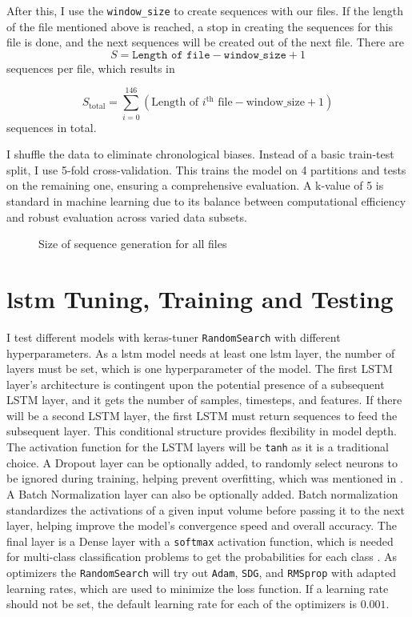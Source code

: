 After this, I use the \texttt{window\_size} to create sequences with our files.
If the length of the file mentioned above is reached, a stop in creating the sequences for this file is done, and the next sequences will be created out of the next file.
There are 
\[S = \texttt{Length of file} - \texttt{window\_size} + 1\] 
sequences per file, which results in 

\[
    S_{\text{total}} = \sum_{i=0}^{146} (\text{Length of } i^{\text{th}} \text{ file} - \text{window\_size} + 1)
\]
sequences in total.

I shuffle the data to eliminate chronological biases. 
Instead of a basic train-test split, I use 5-fold cross-validation.
This trains the model on 4 partitions and tests on the remaining one, ensuring a comprehensive evaluation.
A k-value of 5 is standard in machine learning due to its balance between computational efficiency and robust evaluation across varied data subsets.

\begin{figure}[h]
    \centering
    
    \caption{Size of sequence generation for all files}
    \label{fig:sequence_generation}
\end{figure}


\section{\ac{lstm} Tuning, Training and Testing}

I test different models with keras-tuner \cite{keras_tuner} \texttt{RandomSearch} with different hyperparameters.
As a \ac{lstm} model needs at least one \ac{lstm} layer, the number of layers must be set, which is one hyperparameter of the model.
The first LSTM layer's architecture is contingent upon the potential presence of a subsequent LSTM layer, and it gets the number of samples, timesteps, and features.
If there will be a second LSTM layer, the first LSTM must return sequences to feed the subsequent layer.
This conditional structure provides flexibility in model depth.
The activation function for the LSTM layers will be \texttt{tanh} as it is a traditional choice.
A Dropout layer can be optionally added, to randomly select neurons to be ignored during training, helping prevent overfitting, which was mentioned in .
A Batch Normalization layer can also be optionally added.
Batch normalization standardizes the activations of a given input volume before passing it to the next layer, helping improve the model's convergence speed and overall accuracy.
The final layer is a Dense layer with a \texttt{softmax} activation function, which is needed for multi-class classification problems to get the probabilities for each class \cite{cat_cross_entropy}.
As optimizers the \texttt{RandomSearch} will try out \texttt{Adam}, \texttt{SDG}, and \texttt{RMSprop} with adapted learning rates, which are used to minimize the loss function.
If a learning rate should not be set, the default learning rate for each of the optimizers is \(0.001\).

